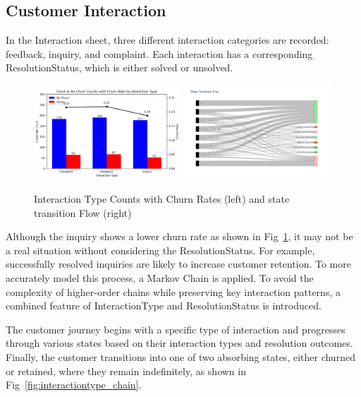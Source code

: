 \documentclass[journal=gmj]{CUP-JNL-DTM}%
\theoremstyle{definition}
\numberwithin{equation}{section}
\begin{document}
\subsection{Customer Interaction}

In the Interaction sheet, three different interaction categories are recorded: feedback, inquiry, and complaint. Each interaction has a corresponding ResolutionStatus, which is either solved or unsolved.

\begin{figure}[h]
    \centering
    \includegraphics[width=0.49\textwidth]{Plots/churn_rate_interactiontype.png} \includegraphics[width=0.49\textwidth]{Plots/flow_interaction.png}
    \caption{Interaction Type Counts with Churn Rates (left) and state transition Flow (right)}
    \label{fig:interactiontype_churn}
\end{figure}

Although the inquiry shows a lower churn rate as shown in Fig~\ref{fig:interactiontype_churn}, it may not be a real situation without considering the ResolutionStatus. For example, successfully resolved inquiries are likely to increase customer retention. To more accurately model this process, a Markov Chain is applied. To avoid the complexity of higher-order chains while preserving key interaction patterns, a combined feature of InteractionType and ResolutionStatus is introduced.

The customer journey begins with a specific type of interaction and progresses through various states based on their interaction types and resolution outcomes. Finally, the customer transitions into one of two absorbing states, either churned or retained, where they remain indefinitely, as shown in Fig~\ref{fig:interactiontype_chain}.
\end{document}
